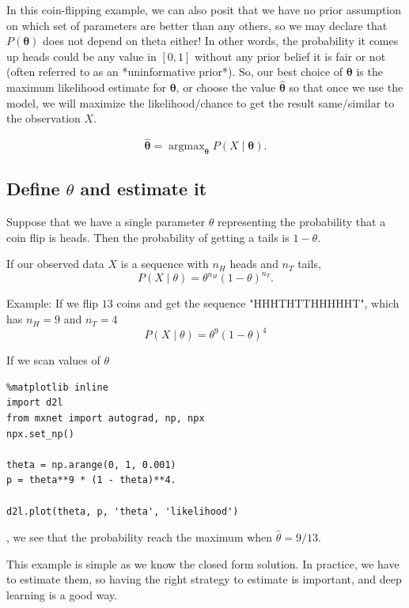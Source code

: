 In this coin-flipping example, we can also posit that we have no prior
assumption on which set of parameters are better than any others, so we may
declare that $P(\boldsymbol{\theta})$ does not depend on theta either! In other
words, the probability it comes up heads could be any value in $[0,1]$ without
any prior belief it is fair or not (often referred to as an *uninformative
prior*).
So, our best choice of $\boldsymbol{\theta}$ is the maximum likelihood estimate
for $\boldsymbol{\theta}$, or choose the value $\hat{\boldsymbol{\theta}}$ so
that once we use the model, we will maximize the likelihood/chance to get the
result same/similar to the observation $X$.

\begin{equation}
\hat{\boldsymbol{\theta}} = \mathop{\mathrm{argmax}} _ {\boldsymbol{\theta}} P(X \mid \boldsymbol{\theta}).
\end{equation}

\subsection{Define $\theta$ and estimate it}
\label{sec:maximum-likelihood}

Suppose that we have a single parameter $\theta$ representing the probability that a coin flip is heads.
Then the probability of getting a tails is $1-\theta$.


If our observed data $X$ is a sequence with $n_H$ heads and $n_T$ tails,
\begin{equation}
P(X \mid \theta) = \theta^{n_H}(1-\theta)^{n_T}.
\end{equation} 

Example: If we flip $13$ coins and get the sequence "HHHTHTTHHHHHT", which has $n_H = 9$ and $n_T = 4$
\begin{equation}
P(X \mid \theta) = \theta^9(1-\theta)^4 
\end{equation}

If we scan values of $\theta$
\begin{lstlisting}
%matplotlib inline
import d2l
from mxnet import autograd, np, npx
npx.set_np()

theta = np.arange(0, 1, 0.001)
p = theta**9 * (1 - theta)**4.

d2l.plot(theta, p, 'theta', 'likelihood')
\end{lstlisting}
, we see that the probability reach the maximum when $\hat{\theta} = 9/13$.

This example is simple as we know the closed form solution. In practice, we have
to estimate them, so having the right strategy to estimate is important, and
deep learning is a good way.


